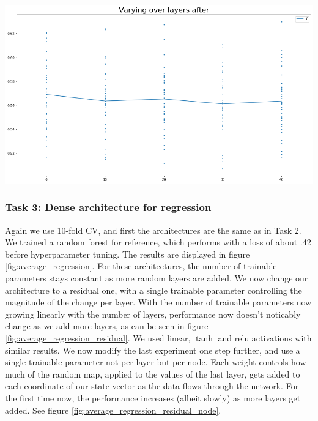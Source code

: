 \documentclass[]{article}
\newenvironment{Figure}
{\par\medskip\noindent\minipage{\linewidth}}
{\endminipage\par\medskip}
\begin{document}
\begin{multicols}{2}
	\begin{Figure}
		\centering
		\includegraphics[width=\linewidth]{average_regression_residual_node}
		\label{fig:average_regression_residual_node}
	\end{Figure}
	
	\subsubsection*{Task 3: Dense architecture for regression}
	Again we use 10-fold CV, and first the architectures are the same as in Task 2. We trained a random forest for reference, which performs with a loss of about .42 before hyperparameter tuning. The results are displayed in figure \ref{fig:average_regression}. For these architectures, the number of trainable parameters stays constant as more random layers are added. We now change our architecture to a residual one, with a single trainable parameter controlling the magnitude of the change per layer. With the number of trainable parameters now growing linearly with the number of layers, performance now doesn't noticably change as we add more layers, as can be seen in figure \ref{fig:average_regression_residual}. We used linear, $\tanh$ and relu activations with similar results. We now modify the last experiment one step further, and use a single trainable parameter not per layer but per node. Each weight controls how much of the random map, applied to the values of the last layer, gets added to each coordinate of our state vector as the data flows through the network. For the first time now, the performance increases (albeit slowly) as more layers get added. See figure \ref{fig:average_regression_residual_node}.
	

\end{multicols}
\end{document}

